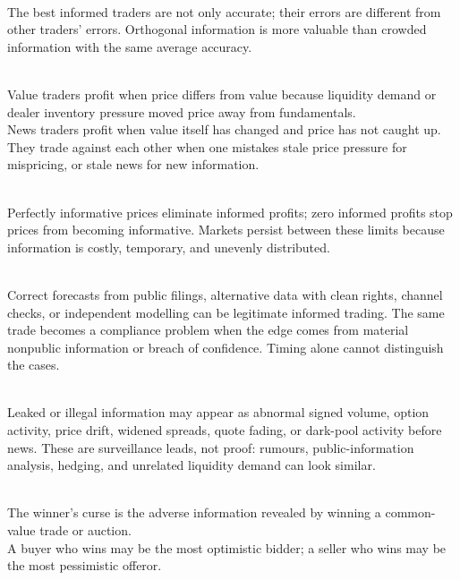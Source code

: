 \documentclass[a4paper,oneside,openany]{book}
\begin{document}
\begin{principle} \\
The best informed traders are not only accurate; their errors are different from other traders' errors. Orthogonal information is more valuable than crowded information with the same average accuracy.
\end{principle}

\begin{principle} \\
Value traders profit when price differs from value because liquidity demand or dealer inventory pressure moved price away from fundamentals.\\
News traders profit when value itself has changed and price has not caught up. They trade against each other when one mistakes stale price pressure for mispricing, or stale news for new information.
\end{principle}

\begin{caveat} \\
Perfectly informative prices eliminate informed profits; zero informed profits stop prices from becoming informative. Markets persist between these limits because information is costly, temporary, and unevenly distributed.
\end{caveat}

\begin{caveat} \\
Correct forecasts from public filings, alternative data with clean rights, channel checks, or independent modelling can be legitimate informed trading. The same trade becomes a compliance problem when the edge comes from material nonpublic information or breach of confidence. Timing alone cannot distinguish the cases.
\end{caveat}

\begin{mechanism} \\
Leaked or illegal information may appear as abnormal signed volume, option activity, price drift, widened spreads, quote fading, or dark-pool activity before news. These are surveillance leads, not proof: rumours, public-information analysis, hedging, and unrelated liquidity demand can look similar.
\end{mechanism}

\begin{definition} \\
The winner's curse is the adverse information revealed by winning a common-value trade or auction.\\
A buyer who wins may be the most optimistic bidder; a seller who wins may be the most pessimistic offeror.
\end{definition}
\end{document}
